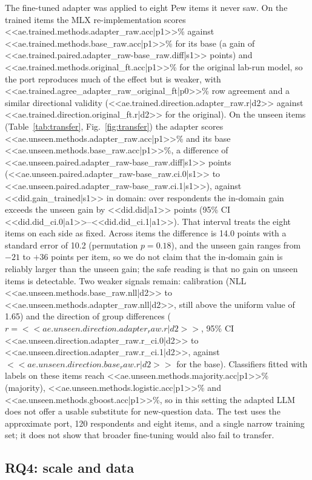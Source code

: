 \documentclass[conference]{IEEEtran}
\begin{document}
The fine-tuned adapter was applied to eight Pew items it never saw. On the trained items the MLX re-implementation scores <<ae.trained.methods.adapter_raw.acc|p1>>\% against <<ae.trained.methods.base_raw.acc|p1>>\% for its base (a gain of <<ae.trained.paired.adapter_raw-base_raw.diff|s1>> points) and <<ae.trained.methods.original_ft.acc|p1>>\% for the original lab-run model, so the port reproduces much of the effect but is weaker, with <<ae.trained.agree_adapter_raw_original_ft|p0>>\% row agreement and a similar directional validity (<<ae.trained.direction.adapter_raw.r|d2>> against <<ae.trained.direction.original_ft.r|d2>> for the original). On the unseen items (Table~\ref{tab:transfer}, Fig.~\ref{fig:transfer}) the adapter scores <<ae.unseen.methods.adapter_raw.acc|p1>>\% and its base <<ae.unseen.methods.base_raw.acc|p1>>\%, a difference of <<ae.unseen.paired.adapter_raw-base_raw.diff|s1>> points (<<ae.unseen.paired.adapter_raw-base_raw.ci.0|s1>> to <<ae.unseen.paired.adapter_raw-base_raw.ci.1|s1>>), against <<did.gain_trained|s1>> in domain: over respondents the in-domain gain exceeds the unseen gain by <<did.did|a1>> points (95\% CI <<did.did_ci.0|a1>>--<<did.did_ci.1|a1>>). That interval treats the eight items on each side as fixed. Across items the difference is 14.0 points with a standard error of 10.2 (permutation $p=0.18$), and the unseen gain ranges from $-21$ to $+36$ points per item, so we do not claim that the in-domain gain is reliably larger than the unseen gain; the safe reading is that no gain on unseen items is detectable. Two weaker signals remain: calibration (NLL <<ae.unseen.methods.base_raw.nll|d2>> to <<ae.unseen.methods.adapter_raw.nll|d2>>, still above the uniform value of 1.65) and the direction of group differences ($r={<<ae.unseen.direction.adapter_raw.r|d2>>}$, 95\% CI <<ae.unseen.direction.adapter_raw.r_ci.0|d2>> to <<ae.unseen.direction.adapter_raw.r_ci.1|d2>>, against $<<ae.unseen.direction.base_raw.r|d2>>$ for the base). Classifiers fitted with labels on these items reach <<ae.unseen.methods.majority.acc|p1>>\% (majority), <<ae.unseen.methods.logistic.acc|p1>>\% and <<ae.unseen.methods.gboost.acc|p1>>\%, so in this setting the adapted LLM does not offer a usable substitute for new-question data. The test uses the approximate port, 120 respondents and eight items, and a single narrow training set; it does not show that broader fine-tuning would also fail to transfer.

\subsection{RQ4: scale and data}
\end{document}
